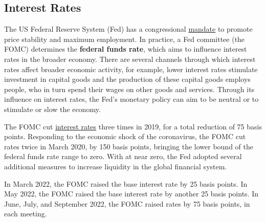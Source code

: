 \documentclass{report}
\begin{document}
{\begin{minipage}{0.76\textwidth}
\subsection*{Interest Rates}
\hypertarget{capint}{}
\small The US Federal Reserve System (Fed) has a congressional \href{https://www.federalreserve.gov/faqs/money_12848.htm}{mandate} to promote price stability and maximum employment. In practice, a Fed committee (the FOMC) determines the \textbf{federal funds rate}, which aims to influence interest rates in the broader economy. There are several channels through which interest rates affect broader economic activity, for example, lower interest rates stimulate investment in capital goods and the production of these capital goods employs people, who in turn spend their wages on other goods and services. Through its influence on interest rates, the Fed's monetary policy can aim to be neutral or to stimulate or slow the economy.

The FOMC cut \href{https://www.federalreserve.gov/releases/h15/}{interest rates} three times in 2019, for a total reduction of 75 basis points. Responding to the economic shock of the coronavirus, the FOMC cut rates twice in March 2020, by 150 basis points, bringing the lower bound of the federal funds rate range to zero. With at near zero, the Fed adopted several additional measures to increase liquidity in the global financial system.

In March 2022, the FOMC raised the base interest rate by 25 basis points. In May 2022, the FOMC raised the base interest rate by another 25 basis points. In June, July, and September 2022, the FOMC raised rates by 75 basis points, in each meeting. 
\vspace{2mm}


\end{minipage}}
\end{document}
